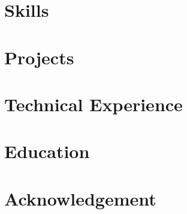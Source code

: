 \documentclass[10pt]{article}
\begin{document}




\section{Skills}


\section{Projects}


\section{Technical Experience}
 

\section{Education}


\section{Acknowledgement}

\end{document}
